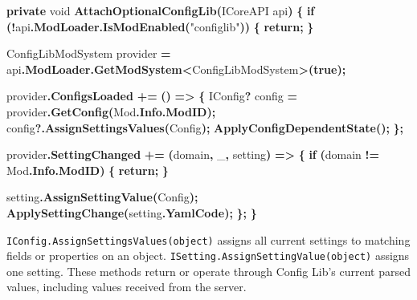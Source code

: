 \documentclass[
  11pt,
  letterpaper,
  titlepage]{article}
\newenvironment{Shaded}{\begin{snugshade}}{\end{snugshade}}
\newcommand{\DataTypeTok}[1]{\textcolor[rgb]{0.13,0.29,0.53}{#1}}
\newcommand{\FunctionTok}[1]{\textcolor[rgb]{0.13,0.29,0.53}{\textbf{#1}}}
\newcommand{\KeywordTok}[1]{\textcolor[rgb]{0.13,0.29,0.53}{\textbf{#1}}}
\newcommand{\NormalTok}[1]{#1}
\newcommand{\OperatorTok}[1]{\textcolor[rgb]{0.81,0.36,0.00}{\textbf{#1}}}
\newcommand{\StringTok}[1]{\textcolor[rgb]{0.31,0.60,0.02}{#1}}
\begin{document}
\begin{Shaded}
\begin{Highlighting}[]
\KeywordTok{private} \DataTypeTok{void} \FunctionTok{AttachOptionalConfigLib}\OperatorTok{(}\NormalTok{ICoreAPI api}\OperatorTok{)}
\OperatorTok{\{}
    \KeywordTok{if} \OperatorTok{(!}\NormalTok{api}\OperatorTok{.}\FunctionTok{ModLoader}\OperatorTok{.}\FunctionTok{IsModEnabled}\OperatorTok{(}\StringTok{"configlib"}\OperatorTok{))}
    \OperatorTok{\{}
        \KeywordTok{return}\OperatorTok{;}
    \OperatorTok{\}}

\NormalTok{    ConfigLibModSystem provider }\OperatorTok{=}
\NormalTok{        api}\OperatorTok{.}\FunctionTok{ModLoader}\OperatorTok{.}\FunctionTok{GetModSystem}\OperatorTok{\textless{}}\NormalTok{ConfigLibModSystem}\OperatorTok{\textgreater{}(}\KeywordTok{true}\OperatorTok{);}

\NormalTok{    provider}\OperatorTok{.}\FunctionTok{ConfigsLoaded} \OperatorTok{+=} \OperatorTok{()} \OperatorTok{=\textgreater{}}
    \OperatorTok{\{}
\NormalTok{        IConfig}\OperatorTok{?}\NormalTok{ config }\OperatorTok{=}\NormalTok{ provider}\OperatorTok{.}\FunctionTok{GetConfig}\OperatorTok{(}\NormalTok{Mod}\OperatorTok{.}\FunctionTok{Info}\OperatorTok{.}\FunctionTok{ModID}\OperatorTok{);}
\NormalTok{        config}\OperatorTok{?.}\FunctionTok{AssignSettingsValues}\OperatorTok{(}\NormalTok{Config}\OperatorTok{);}
        \FunctionTok{ApplyConfigDependentState}\OperatorTok{();}
    \OperatorTok{\};}

\NormalTok{    provider}\OperatorTok{.}\FunctionTok{SettingChanged} \OperatorTok{+=} \OperatorTok{(}\NormalTok{domain}\OperatorTok{,}\NormalTok{ \_}\OperatorTok{,}\NormalTok{ setting}\OperatorTok{)} \OperatorTok{=\textgreater{}}
    \OperatorTok{\{}
        \KeywordTok{if} \OperatorTok{(}\NormalTok{domain }\OperatorTok{!=}\NormalTok{ Mod}\OperatorTok{.}\FunctionTok{Info}\OperatorTok{.}\FunctionTok{ModID}\OperatorTok{)}
        \OperatorTok{\{}
            \KeywordTok{return}\OperatorTok{;}
        \OperatorTok{\}}

\NormalTok{        setting}\OperatorTok{.}\FunctionTok{AssignSettingValue}\OperatorTok{(}\NormalTok{Config}\OperatorTok{);}
        \FunctionTok{ApplySettingChange}\OperatorTok{(}\NormalTok{setting}\OperatorTok{.}\FunctionTok{YamlCode}\OperatorTok{);}
    \OperatorTok{\};}
\OperatorTok{\}}
\end{Highlighting}
\end{Shaded}

\texttt{IConfig.AssignSettingsValues(object)} assigns all current
settings to matching fields or properties on an object.
\texttt{ISetting.AssignSettingValue(object)} assigns one setting. These
methods return or operate through Config Lib's current parsed values,
including values received from the server.
\end{document}

